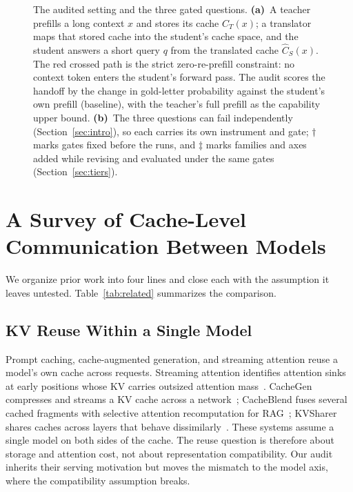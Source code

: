 \documentclass{article} %
\begin{document}
\begin{figure}[t]
\centering

\caption{The audited setting and the three gated questions.
\textbf{(a)}~A teacher prefills a long context $x$ and stores its cache
$C_T(x)$; a translator maps that stored cache into the student's cache space,
and the student answers a short query $q$ from the translated cache
$\hat{C}_S(x)$. The red crossed path is the strict zero-re-prefill constraint:
no context token enters the student's forward pass. The audit scores the
handoff by the change in gold-letter probability against the student's own
prefill (baseline), with the teacher's full prefill as the capability upper
bound. \textbf{(b)}~The three questions can fail independently
(Section~\ref{sec:intro}), so each carries its own instrument and gate;
$\dagger$ marks gates fixed before the runs, and $\ddagger$ marks families and
axes added while revising and evaluated under the same gates
(Section~\ref{sec:tiers}).}
\label{fig:framework}
\end{figure}

\section{A Survey of Cache-Level Communication Between Models}
\label{sec:survey}

We organize prior work into four lines and close each with the assumption it
leaves untested. Table~\ref{tab:related} summarizes the comparison.

\subsection{KV Reuse Within a Single Model}
Prompt caching, cache-augmented generation, and streaming attention reuse a
model's own cache across requests. Streaming attention identifies attention
sinks at early positions whose KV carries outsized attention
mass~\citep{streamingsink2023}. CacheGen compresses and streams a KV cache
across a network~\citep{cachegen2024}; CacheBlend fuses several cached
fragments with selective attention recomputation for
RAG~\citep{cacheblend2025}; KVSharer shares caches across layers that behave
dissimilarly~\citep{kvsharer2024}. These systems assume a single model on
both sides of the cache. The reuse question is therefore about storage and
attention cost, not about representation compatibility. Our audit inherits
their serving motivation but moves the mismatch to the model axis, where the
compatibility assumption breaks.
\end{document}
